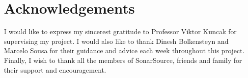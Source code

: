 \section*{Acknowledgements}
\label{sec:acknowledgements}

I would like to express my sincerest gratitude to Professor Viktor Kuncak for supervising my project.
\newline
\newline
I would also like to thank Dinesh Bolkensteyn and Marcelo Sousa for their guidance and advice each week throughout this project.
\newline
\newline
Finally, I wish to thank all the members of SonarSource, friends and family for their support and encouragement.